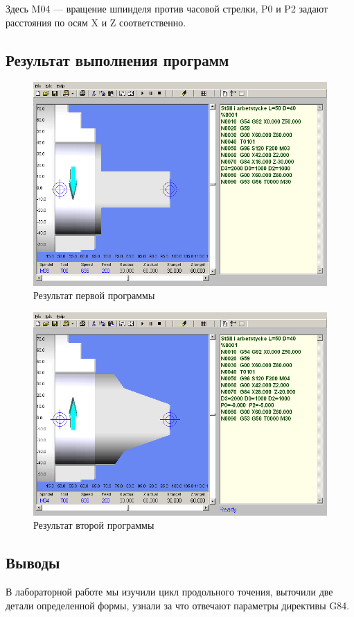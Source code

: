 Здесь M04 --- вращение шпинделя против часовой стрелки, P0 и P2 задают расстояния по осям X и Z соответственно.

\subsection*{Результат выполнения программ}

\begin{figure}[ht]
\centering
	\includegraphics[width=.7\linewidth]{Figures/task1.png}
    \caption{Результат первой программы\label{fig:task1}}
\end{figure}

\begin{figure}[ht]
\centering
	\includegraphics[width=.7\linewidth]{Figures/task2.png}
    \caption{Результат второй программы\label{fig:task2}}
\end{figure}

\subsection*{Выводы}

В лабораторной работе мы изучили цикл продольного точения, выточили две детали определенной формы, узнали за что отвечают параметры директивы G84.

\clearpage

